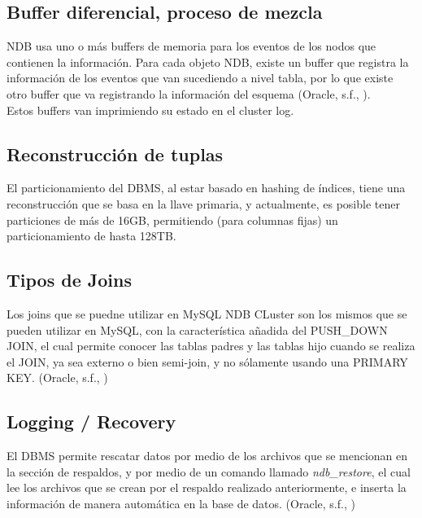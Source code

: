 \documentclass{acmart}
\begin{document}
\subsection{Buffer diferencial, proceso de mezcla}
NDB usa uno o más buffers de memoria para los eventos de los nodos que contienen la información. Para cada objeto NDB, existe un buffer que registra la información de los eventos que van sucediendo a nivel tabla, por lo que existe otro buffer que va registrando la información del esquema (Oracle, s.f., \cite{mysqlbuff}).\\
Estos buffers van imprimiendo su estado en el cluster log.
\subsection{Reconstrucción de tuplas}
El particionamiento del DBMS, al estar basado en hashing de índices, tiene una reconstrucción que se basa en la llave primaria, y actualmente, es posible tener particiones de más de 16GB, permitiendo (para columnas fijas) un particionamiento de hasta 128TB.

\subsection{Tipos de Joins}
Los joins que se puedne utilizar en MySQL NDB CLuster son los mismos que se pueden utilizar en MySQL, con la característica añadida del PUSH\_DOWN JOIN, el cual permite conocer las tablas padres y las tablas hijo cuando se realiza el JOIN, ya sea externo o bien semi-join, y no sólamente usando una PRIMARY KEY. (Oracle, s.f., \cite{mysqlnew})

\subsection{Logging / Recovery}
El DBMS permite rescatar datos por medio de los archivos que se mencionan en la sección de respaldos, y por medio de un comando llamado \textit{ndb\_restore}, el cual lee los archivos que se crean por el respaldo realizado anteriormente, e inserta la información de manera automática en la base de datos. (Oracle, s.f., \cite{mysqlrestore})
\end{document}
